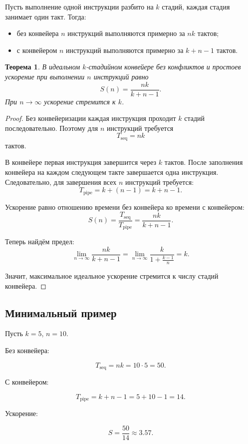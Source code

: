\documentclass[12pt,a4paper]{article}
\newtheorem{theorem}{Теорема}
\begin{document}
Пусть выполнение одной инструкции разбито на $k$ стадий, каждая стадия занимает один такт. Тогда:

\begin{itemize}
    \item без конвейера $n$ инструкций выполняются примерно за $nk$ тактов;
    \item с конвейером $n$ инструкций выполняются примерно за $k+n-1$ тактов.
\end{itemize}

\begin{theorem}
В идеальном $k$-стадийном конвейере без конфликтов и простоев ускорение при выполнении $n$ инструкций равно
\[
    S(n) = \frac{nk}{k+n-1}.
\]
При $n \to \infty$ ускорение стремится к $k$.
\end{theorem}

\begin{proof}
Без конвейеризации каждая инструкция проходит $k$ стадий последовательно. Поэтому для $n$ инструкций требуется
\[
    T_{\text{seq}} = nk
\]
тактов.

В конвейере первая инструкция завершится через $k$ тактов. После заполнения конвейера на каждом следующем такте завершается одна инструкция. Следовательно, для завершения всех $n$ инструкций требуется:
\[
    T_{\text{pipe}} = k + (n-1) = k+n-1.
\]

Ускорение равно отношению времени без конвейера ко времени с конвейером:
\[
    S(n) = \frac{T_{\text{seq}}}{T_{\text{pipe}}}
         = \frac{nk}{k+n-1}.
\]

Теперь найдём предел:
\[
    \lim_{n\to\infty} \frac{nk}{k+n-1}
    =
    \lim_{n\to\infty} \frac{k}{1+\frac{k-1}{n}}
    =
    k.
\]

Значит, максимальное идеальное ускорение стремится к числу стадий конвейера.
\end{proof}

\subsection{Минимальный пример}

Пусть $k=5$, $n=10$.

Без конвейера:

\[
    T_{\text{seq}} = nk = 10 \cdot 5 = 50.
\]

С конвейером:

\[
    T_{\text{pipe}} = k+n-1 = 5+10-1=14.
\]

Ускорение:

\[
    S = \frac{50}{14} \approx 3.57.
\]
\end{document}
